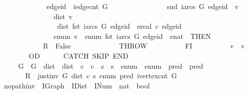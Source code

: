 \begin{isabellebody}
\ \ \ \ \ \ \ \ \ \ \ \ \ {\isacharparenleft}{\isasymacute}edge{\isacharunderscore}id\ {\isasymge}\ iedge{\isacharunderscore}cnt\ {\isasymacute}G\ \isanewline
\ \ \ \ \ \ \ \ \ \ \ \ \ \ {\isasymor}\ snd\ {\isacharparenleft}iarcs\ {\isasymacute}G\ {\isasymacute}edge{\isacharunderscore}id{\isacharparenright}\ {\isasymnoteq}\ {\isasymacute}v\isanewline
\ \ \ \ \ \ \ \ \ \ \ \ \ \ {\isasymor}\ {\isasymacute}dist\ {\isasymacute}v\ {\isasymnoteq}\ \isanewline
\ \ \ \ \ \ \ \ \ \ \ \ \ \ \ \ {\isasymacute}dist\ {\isacharparenleft}fst\ {\isacharparenleft}iarcs\ {\isasymacute}G\ {\isasymacute}edge{\isacharunderscore}id{\isacharparenright}{\isacharparenright}\ {\isacharplus}\ ereal\ {\isacharparenleft}{\isasymacute}c\ {\isasymacute}edge{\isacharunderscore}id{\isacharparenright}\isanewline
\ \ \ \ \ \ \ \ \ \ \ \ \ \ {\isasymor}\ {\isasymacute}enum\ {\isasymacute}v\ {\isasymnoteq}\ {\isasymacute}enum\ {\isacharparenleft}fst\ {\isacharparenleft}iarcs\ {\isasymacute}G\ {\isasymacute}edge{\isacharunderscore}id{\isacharparenright}{\isacharparenright}\ {\isacharplus}\ {\isacharparenleft}enat\ {}{\isacharparenright}{\isacharparenright}\ THEN\isanewline
\ \ \ \ \ \ \ \ \ \ \ \ {\isasymacute}R\ {\isacharcolon}{\isacharequal}{\isacharequal}\ False\ {\isacharsemicolon}{\isacharsemicolon}\isanewline
\ \ \ \ \ \ \ \ \ \ \ \ THROW\isanewline
\ \ \ \ \ \ \ \ \ \ FI{\isacharsemicolon}{\isacharsemicolon}\isanewline
\ \ \ \ \ \ \ \ \ \ {\isasymacute}v\ {\isacharcolon}{\isacharequal}{\isacharequal}\ {\isasymacute}v\ {\isacharplus}\ {}\isanewline
\ \ \ \ \ \ \ \ OD\isanewline
\ \ \ \ \ \ CATCH\ SKIP\ END\isanewline
\ \ \ \ {\isasymlbrace}\ {\isasymacute}G\ {\isacharequal}\ G\ {\isasymand}\ {\isasymacute}dist\ {\isacharequal}\ dist\ {\isasymand}\ {\isasymacute}c\ {\isacharequal}\ c\ {\isasymand}\ {\isasymacute}s\ {\isacharequal}\ s\ {\isasymand}\ {\isasymacute}enum\ {\isacharequal}\ enum\ {\isasymand}\ {\isasymacute}pred\ {\isacharequal}\ pred\isanewline
\ \ \ \ \ \ {\isasymand}\ {\isasymacute}R\ {\isacharequal}\ just{\isacharunderscore}inv\ {\isasymacute}G\ {\isasymacute}dist\ {\isasymacute}c\ {\isasymacute}s\ {\isasymacute}enum\ {\isasymacute}pred\ {\isacharparenleft}ivertex{\isacharunderscore}cnt\ {\isasymacute}G{\isacharparenright}\ {\isasymrbrace}\isanewline
\ \ {\isachardoublequoteclose}\isanewline
\isanewline
{}\isamarkupfalse%
\ no{\isacharunderscore}path{\isacharunderscore}inv\ {\isacharcolon}{\isacharcolon}\ {\isachardoublequoteopen}IGraph\ {\isasymRightarrow}\ IDist\ {\isasymRightarrow}\ INum\ {\isasymRightarrow}\ nat\ {\isasymRightarrow}\ bool{\isachardoublequoteclose}\ \isanewline

\end{isabellebody}
